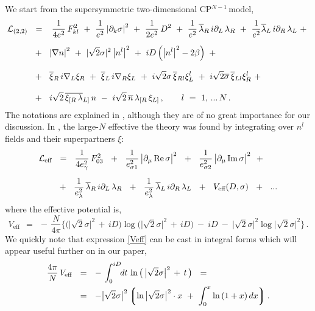 \documentclass[epsfig,12pt]{article}
\def\beq{\begin{equation}}
\def\eeq{\end{equation}}
\newcommand{\p}{\partial}
\newcommand{\ov}{\overline}
\newcommand{\mc}[1]{\mathcal{#1}}
\newcommand{\lgr}{\left\lgroup}
\newcommand{\rgr}{\right\rgroup}
\newcommand{\bxir}{\ov{\xi}{}_R}
\newcommand{\bxil}{\ov{\xi}{}_L}
\newcommand{\xir}{\xi_R}
\newcommand{\xil}{\xi_L}
\newcommand{\nbar}{\ov{n}}
\newcommand{\cpn}{CP$^{N-1}$\,}
\newcommand{\lar}{\lambda_R}
\newcommand{\lal}{\lambda_L}
\newcommand{\blar}{\ov{\lambda}{}_R}
\newcommand{\blal}{\ov{\lambda}{}_L}
\begin{document}
	We start from the supersymmetric two-dimensional \cpn model,
\begin{align}
\label{sigma22}
% 
\notag
 	\mc{L}_\text{(2,2)} & ~~=~~
	\,\frac{1}{4e^2}\,F_{kl}^2  ~+~ \frac{1}{e^2} \left|\p_k \sigma\right|^2 
	~+~ \frac{1}{2e^2}\, D^2
	~+~ \frac{1}{e^2}\, \blar\, i\p_L\, \lar  ~+~  \frac{1}{e^2} \blal\, i\p_R\, \lal
	~+~
	\\[2mm]
%
	&
	~~+~~
	\left| \nabla n \right|^2  ~+~ | \sqrt{2}\sigma |^2 \left| n^l \right|^2
	~+~ iD \left( \left|n^l \right|^2 - 2\beta \right)
	~+~
	\\[2.8mm]
%
\notag	&
	~~+~~ \bxir\, i\nabla_L \xir  ~+~ \bxil\, i\nabla_R \xil ~+~
	i\sqrt{2}\sigma\, \ov{\xi}{}_{Rl} \xi_L^l
	~+~ i\sqrt{2}\ov{\sigma}\, \ov{\xi}{}_{Ll} \xi_R^l
	~+~
	\\[2.8mm]
%
\notag
	&
	~~+~~ i\sqrt{2}\, \ov{\xi_{[R}\, \lambda}{}_{L]}\, n
	~-~ i\sqrt{2}\, \nbar\,  \lambda_{[R}\, \xi_{L]}\,,
	\qquad
	l  ~=~  1,\,...\,N\,.
\end{align}
	The notations are explained in \cite{BSY3}, although they are of no great importance
	for our discussion. 
	In \cite{SYhet}, the large-$ N $ effective the theory was found
	by integrating over $ n^l $ fields and their superpartners $ \xi $:
\begin{align}
%
\notag
	\mc{L}_\text{eff}	& ~~=~~
                \frac{1}{4e_\gamma^2}\,F_{03}^2
		~~+~~ \frac{1}{e_{\sigma 1}^2}\,\big|\p_\mu\,\text{Re}\,\sigma\big|^2
		~~+~~ \frac{1}{e_{\sigma 2}^2}\,\big|\p_\mu\,\text{Im}\,\sigma\big|^2
		~~+~~
	\\[2mm]
%
\label{Leff}
	&
                ~~+~~ \frac{1}{e_\lambda^2}\,\ov{\lambda}{}_R\, i\p_L\, \lambda_R
                ~~+~~ \frac{1}{e_\lambda^2}\,\ov{\lambda}{}_L\, i\p_R\, \lambda_L
                ~~+~~ V_\text{eff}(D, \sigma)
                ~~+~~ ...
\end{align}
	where the effective potential is,
\beq
\label{Veff}
	V_\text{eff}    ~~=~~    -\, \frac{N}{4\pi} 
	\bigg\{
		\big( \big|\sqrt{2}\sigma\big|^2 \,+\, iD \big) 
		\log \big( \big|\sqrt{2}\sigma\big|^2 \,+\, iD \big)
		~-~
		iD
		~-~
		\big|\sqrt{2}\sigma\big|^2 \log \big|\sqrt{2}\sigma\big|^2
	\bigg\}\,.
\eeq
	We quickly note that expression \eqref{Veff} can be cast
	in integral forms which will appear useful further on in our paper,
\begin{align}
%
\notag
	\frac{4\pi}{N}\, V_\text{eff} &    ~~=~~    -\, \int_0^{iD} \!\!dt\, \ln \big(\, \big|\sqrt{2}\sigma\big|^2 \,+\, t \,\big)
	~~=
	\\
%
\label{Vint}
	&
	~~=~~    - \big|\sqrt{2}\sigma\big|^2 \lgr \ln \big|\sqrt{2}\sigma\big|^2 \cdot x ~+~
						\int_0^x \ln\, (1 + x)\, dx \rgr.
\end{align}
\end{document}
